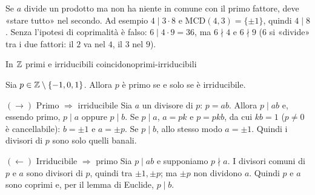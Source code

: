 \begin{spiegazione}
    Se $a$ divide un prodotto ma non ha niente in comune con il primo fattore, deve «stare tutto» nel secondo. Ad esempio $4 \mid 3 \cdot 8$
    e $\mathrm{MCD}(4, 3) = \{\pm 1\}$, quindi $4 \mid 8$. Senza l'ipotesi di coprimalità è falso: $6 \mid 4 \cdot 9 = 36$, ma $6 \nmid 4$ e $6 \nmid 9$
    ($6$ si «divide» tra i due fattori: il $2$ va nel $4$, il $3$ nel $9$).
\end{spiegazione}


\begin{concetto}
\begin{Teorema}{In $\mathbb{Z}$ primi e irriducibili coincidono}{primi-irriducibili}
    \begin{prerequisiti}
    \end{prerequisiti}
    Sia $p \in \mathbb{Z} \setminus \{-1, 0, 1\}$. Allora $p$ è primo se e solo se è irriducibile.
\end{Teorema}
\begin{dimostrazione}
    \begin{caso}{$(\rightarrow)$ Primo $\Rightarrow$ irriducibile}
        Sia $a$ un divisore di $p$: $p = ab$. Allora $p \mid ab$ e, essendo primo, $p \mid a$ oppure $p \mid b$. Se $p \mid a$, $a = pk$ e
        $p = pkb$, da cui $kb = 1$ ($p \neq 0$ è cancellabile): $b = \pm 1$ e $a = \pm p$. Se $p \mid b$, allo stesso modo $a = \pm 1$.
        Quindi i divisori di $p$ sono solo quelli banali.
    \end{caso}
    \begin{caso}{$(\leftarrow)$ Irriducibile $\Rightarrow$ primo}
        Sia $p \mid ab$ e supponiamo $p \nmid a$. I divisori comuni di $p$ e $a$ sono divisori di $p$, quindi tra $\pm 1, \pm p$; ma $\pm p$ non
        dividono $a$. Quindi $p$ e $a$ sono coprimi e, per il lemma di Euclide, $p \mid b$.
    \end{caso}
\end{dimostrazione}
\end{concetto}

